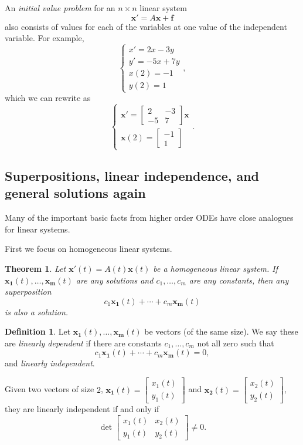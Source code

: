 \documentclass[12pt]{amsart}
\numberwithin{equation}{section}
\theoremstyle{plain} %
\newtheorem{thm}[equation]{Theorem}
\theoremstyle{definition}
\newtheorem{defn}[equation]{Definition}
\theoremstyle{remark}
\begin{document}
An \emph{initial value problem} for an $n\times n$ linear system 
\[ \mathbf{x'} = A \mathbf{x} + \mathbf{f}\] 
also consists of values for each of the variables at one value of the independent variable. For example,
\[ \begin{cases} x' = 2x - 3y \\ y' = -5x + 7y \\ x(2) = -1\\ y(2) = 1\end{cases}, \]
which we can rewrite as
\[  \begin{cases} \mathbf{x'}  = \begin{bmatrix} 2 & - 3 \\  -5 & 7\end{bmatrix} \mathbf{x}\\
\mathbf{x}(2) = \begin{bmatrix} -1 \\ 1 \end{bmatrix}\end{cases}. \]



\subsection*{Superpositions, linear independence, and general solutions again}

Many of the important basic facts from higher order ODEs have close analogues for linear systems.

First we focus on homogeneous linear systems.

\begin{thm} Let $\mathbf{x'}(t) =A(t) \mathbf{x}(t)$ be a homogeneous linear system. If $\mathbf{x_1}(t),\dots,\mathbf{x_m}(t)$ are any solutions and $c_1,\dots,c_m$ are any constants, then any superposition
\[ c_1 \mathbf{x_1}(t)+ \cdots + c_m\mathbf{x_m}(t)\]
is also a solution.
\end{thm}

\begin{defn}
Let $\mathbf{x_1}(t),\dots,\mathbf{x_m}(t)$ be vectors (of the same size). We say these are \emph{linearly dependent} if there are constants $c_1,\dots,c_m$ not all zero such that 
\[ c_1 \mathbf{x_1}(t)+ \cdots + c_m\mathbf{x_m}(t) =0, \]
and \emph{linearly independent}.
\end{defn}

Given two vectors of size $2$, $\mathbf{x_1}(t)=\begin{bmatrix} x_1(t) \\ y_1(t)\end{bmatrix}$ and $\mathbf{x_2}(t)=\begin{bmatrix} x_2(t) \\ y_2(t)\end{bmatrix}$, they are linearly independent if and only if
\[ \det \begin{bmatrix} x_1(t) & x_2(t) \\ y_1(t) & y_2(t)\end{bmatrix} \neq 0.\]
\end{document}
